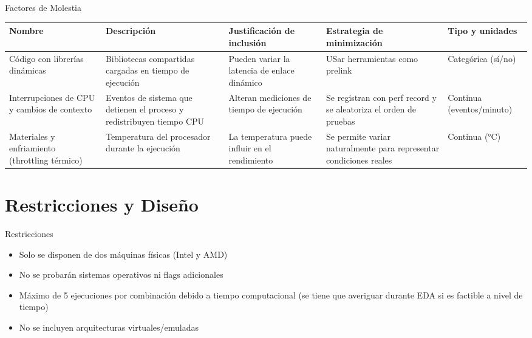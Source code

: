 \documentclass[aspectratio=169]{beamer}
\begin{document}
\begin{frame}{Factores de Molestia}
    \small
    \begin{table}
        \begin{tabularx}{\textwidth}{|>{\raggedright\arraybackslash}p{2.5cm}|>{\raggedright\arraybackslash}X|>{\raggedright\arraybackslash}X|>{\raggedright\arraybackslash}X|>{\raggedright\arraybackslash}p{2cm}|}
            \hline
            \textbf{Nombre} & \textbf{Descripción} & \textbf{Justificación de inclusión} & \textbf{Estrategia de minimización} & \textbf{Tipo y unidades} \\
            \hline
            Código con librerías dinámicas & Bibliotecas compartidas cargadas en tiempo de ejecución & Pueden variar la latencia de enlace dinámico & USar herramientas como prelink& Categórica (sí/no) \\
            \hline
            Interrupciones de CPU y cambios de contexto & Eventos de sistema que detienen el proceso y redistribuyen tiempo CPU & Alteran mediciones de tiempo de ejecución & Se registran con perf record y se aleatoriza el orden de pruebas & Continua (eventos/minuto) \\
            \hline
            Materiales y enfriamiento (throttling térmico) & Temperatura del procesador durante la ejecución & La temperatura puede influir en el rendimiento & Se permite variar naturalmente para representar condiciones reales & Continua (°C) \\
            \hline
        \end{tabularx}
    \end{table}
\end{frame}

\section{Restricciones y Diseño}

\begin{frame}{Restricciones}
    \begin{itemize}
        \item Solo se disponen de dos máquinas físicas (Intel y AMD)
        \item No se probarán sistemas operativos ni flags adicionales
        \item Máximo de 5 ejecuciones por combinación debido a tiempo computacional (se tiene que averiguar durante EDA si es factible a nivel de tiempo)
        \item No se incluyen arquitecturas virtuales/emuladas
    \end{itemize}
\end{frame}
\end{document}
